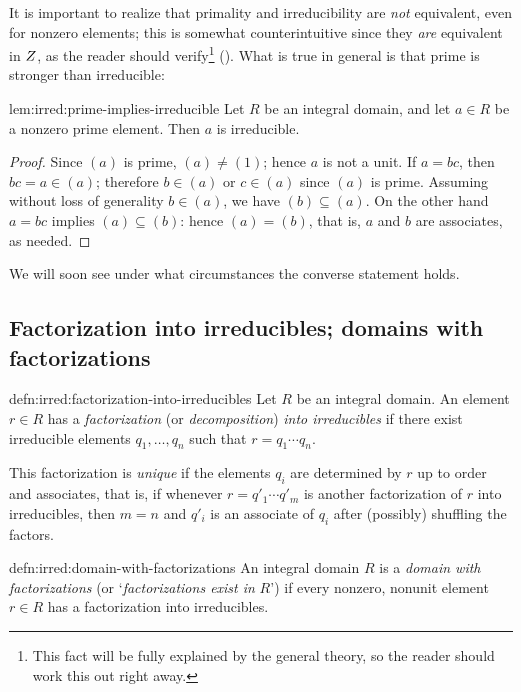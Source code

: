 It is important to realize that primality and irreducibility are
\emph{not} equivalent, even for nonzero elements; this is somewhat
counterintuitive since they \emph{are} equivalent in $Z$, as the
reader should verify\footnote{This fact will be fully explained by the
  general theory, so the reader should work this out right away.}
(). What is true in general is
that prime is stronger than irreducible:

\begin{lem}{}{lem:irred:prime-implies-irreducible}
  Let $R$ be an integral domain, and let $a \in R$ be a nonzero prime
  element. Then $a$ is irreducible.
\end{lem}

\begin{proof}
  Since $(a)$ is prime, $(a) \neq (1)$; hence $a$ is not a unit. If
  $a = bc$, then $bc = a \in (a)$; therefore $b \in (a)$ or
  $c \in (a)$ since $(a)$ is prime. Assuming without loss of
  generality $b \in (a)$, we have $(b) \subseteq (a)$. On the other
  hand $a = bc$ implies $(a) \subseteq (b)$: hence $(a) = (b)$, that
  is, $a$ and $b$ are associates, as needed.
\end{proof}

We will soon see under what circumstances the converse statement
holds.

\subsection{Factorization into irreducibles; domains with
  factorizations}
\label{subsec:irred:factorization-into-irreducibles-domains-with-factorizations}

\begin{defn}{}{defn:irred:factorization-into-irreducibles}
  Let $R$ be an integral domain. An element $r \in R$ has a
  \emph{factorization} (or \emph{decomposition}) \emph{into
    irreducibles} if there exist irreducible elements
  $q_1, \dots, q_n$ such that $r = q_1 \cdots q_n$.

  This factorization is \emph{unique} if the elements $q_i$ are
  determined by $r$ up to order and associates, that is, if whenever
  $r = q'_1 \cdots q'_m$ is another factorization of $r$ into
  irreducibles, then $m = n$ and $q'_i$ is an associate of $q_i$ after
  (possibly) shuffling the factors.
\end{defn}

\begin{defn}{}{defn:irred:domain-with-factorizations}
  An integral domain $R$ is a \emph{domain with factorizations} (or
  `\emph{factorizations exist in} $R$') if every nonzero, nonunit
  element $r \in R$ has a factorization into irreducibles.
\end{defn}

